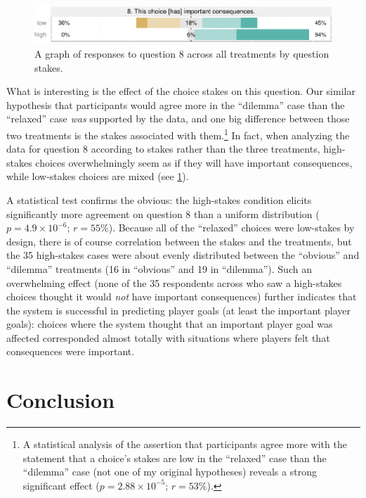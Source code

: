 \begin{figure}[!h]
  \includegraphics[width=\textwidth]{fig/stakes-q8.pdf}
  \caption{A graph of responses to question 8 across all treatments by question stakes.}
  \label{fig:stakesq8}
\end{figure}


What is interesting is the effect of the choice stakes on this question.
%
Our similar hypothesis that participants would agree more in the ``dilemma'' case than the ``relaxed'' case \emph{was} supported by the data, and one big difference between those two treatments is the stakes associated with them.\footnote{A statistical analysis of the assertion that participants agree more with the statement that a choice's stakes are low in the ``relaxed'' case than the ``dilemma'' case (not one of my original hypotheses) reveals a strong significant effect ($p = 2.88\times10^{-5}$; $r = 53\%$).}
%
In fact, when analyzing the data for question 8 according to stakes rather than the three treatments, high-stakes choices overwhelmingly seem as if they will have important consequences, while low-stakes choices are mixed (see \cref{fig:stakesq8}).


A statistical test confirms the obvious: the high-stakes condition elicits significantly more agreement on question 8 than a uniform distribution ($p = 4.9\times10^{-6}$; $r = 55$\%).
%
Because all of the ``relaxed'' choices were low-stakes by design, there is of course correlation between the stakes and the treatments, but the 35 high-stakes cases were about evenly distributed between the ``obvious'' and ``dilemma'' treatments (16 in ``obvious'' and 19 in ``dilemma'').
%
Such an overwhelming effect (none of the 35 respondents across who saw a high-stakes choices thought it would \emph{not} have important consequences) further indicates that the system is successful in predicting player goals (at least the important player goals): choices where the system thought that an important player goal was affected corresponded almost totally with situations where players felt that consequences were important.


\section{Conclusion}

